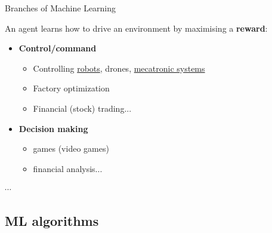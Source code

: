 \documentclass[10pt,serif,mathserif,compress,hyperref={colorlinks}]{beamer}
\begin{document}
\begin{frame}{Branches of Machine Learning}  
  \begin{tcolorbox}[title=Reinforcement learning]
    An agent learns how to drive an environment by maximising a \textbf{reward}:
    \begin{itemize}

    \item \textbf{Control/command}
      \begin{itemize}
      \item Controlling \href{run:./videos/trained-PPO-example.webm}{robots}, drones, \href{https://www.linkedin.com/in/jean-luc-charles-54898aa7/recent-activity/all/}{mecatronic systems}
      \item Factory optimization
      \item Financial (stock) trading...
      \end{itemize}        
    \item \textbf{Decision making}
      \begin{itemize}
      \item games (video games)
      \item financial analysis...
      \end{itemize}
    \end{itemize}
    \vspace*{-1mm}$\cdots$
  \end{tcolorbox}    
\end{frame}

\subsection{ML algorithms}
\end{document}
